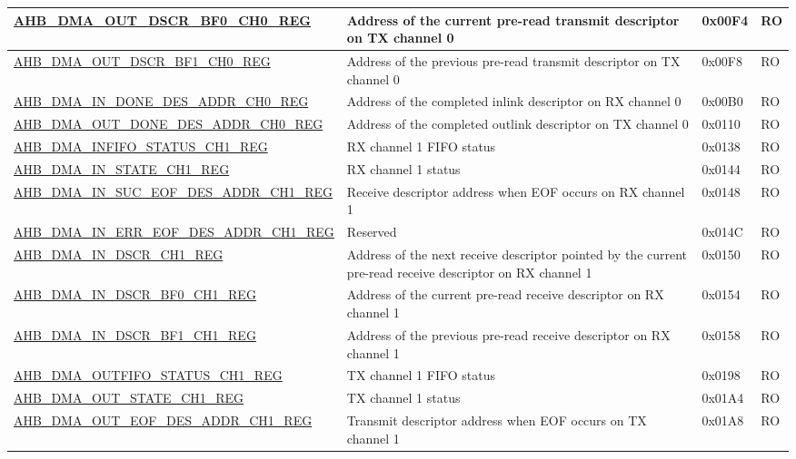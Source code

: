 \begin{longtable}{ | p{8cm} | p{8cm} | p{1.3cm} | p{1.5cm} | }
\hyperref[regdesc:AHBDMAOUTDSCRBF0CHNREG]{AHB\_DMA\_OUT\_DSCR\_BF0\_CH0\_REG} & Address of the current pre-read transmit descriptor on TX channel 0 & 0x00F4 & RO \\ \hline
\hyperref[regdesc:AHBDMAOUTDSCRBF1CHNREG]{AHB\_DMA\_OUT\_DSCR\_BF1\_CH0\_REG} & Address of the previous pre-read transmit descriptor on TX channel 0 & 0x00F8 & RO \\ \hline
\hyperref[regdesc:AHBDMAINDONEDESADDRCHNREG]{AHB\_DMA\_IN\_DONE\_DES\_ADDR\_CH0\_REG} & Address of the completed inlink descriptor on RX channel 0 & 0x00B0 & RO \\ \hline
\hyperref[regdesc:AHBDMAOUTDONEDESADDRCHNREG]{AHB\_DMA\_OUT\_DONE\_DES\_ADDR\_CH0\_REG} & Address of the completed outlink descriptor on TX channel 0 & 0x0110 & RO \\ \hline
\hyperref[regdesc:AHBDMAINFIFOSTATUSCHNREG]{AHB\_DMA\_INFIFO\_STATUS\_CH1\_REG} & RX channel 1 FIFO status & 0x0138 & RO \\ \hline
\hyperref[regdesc:AHBDMAINSTATECHNREG]{AHB\_DMA\_IN\_STATE\_CH1\_REG} & RX channel 1 status & 0x0144 & RO \\ \hline
\hyperref[regdesc:AHBDMAINSUCEOFDESADDRCHNREG]{AHB\_DMA\_IN\_SUC\_EOF\_DES\_ADDR\_CH1\_REG} & Receive descriptor address when EOF occurs on RX channel 1 & 0x0148 & RO \\ \hline
\hyperref[regdesc:AHBDMAINERREOFDESADDRCH1REG]{AHB\_DMA\_IN\_ERR\_EOF\_DES\_ADDR\_CH1\_REG} & Reserved & 0x014C & RO \\ \hline
\hyperref[regdesc:AHBDMAINDSCRCHNREG]{AHB\_DMA\_IN\_DSCR\_CH1\_REG} & Address of the next receive descriptor pointed by the current pre-read receive descriptor on RX channel 1 & 0x0150 & RO \\ \hline
\hyperref[regdesc:AHBDMAINDSCRBF0CHNREG]{AHB\_DMA\_IN\_DSCR\_BF0\_CH1\_REG} & Address of the current pre-read receive descriptor on RX channel 1 & 0x0154 & RO \\ \hline
\hyperref[regdesc:AHBDMAINDSCRBF1CHNREG]{AHB\_DMA\_IN\_DSCR\_BF1\_CH1\_REG} & Address of the previous pre-read receive descriptor on RX channel 1 & 0x0158 & RO \\ \hline
\hyperref[regdesc:AHBDMAOUTFIFOSTATUSCHNREG]{AHB\_DMA\_OUTFIFO\_STATUS\_CH1\_REG} & TX channel 1 FIFO status & 0x0198 & RO \\ \hline
\hyperref[regdesc:AHBDMAOUTSTATECHNREG]{AHB\_DMA\_OUT\_STATE\_CH1\_REG} & TX channel 1 status & 0x01A4 & RO \\ \hline
\hyperref[regdesc:AHBDMAOUTEOFDESADDRCHNREG]{AHB\_DMA\_OUT\_EOF\_DES\_ADDR\_CH1\_REG} & Transmit descriptor address when EOF occurs on TX channel 1 & 0x01A8 & RO \\ \hline

\end{longtable}
